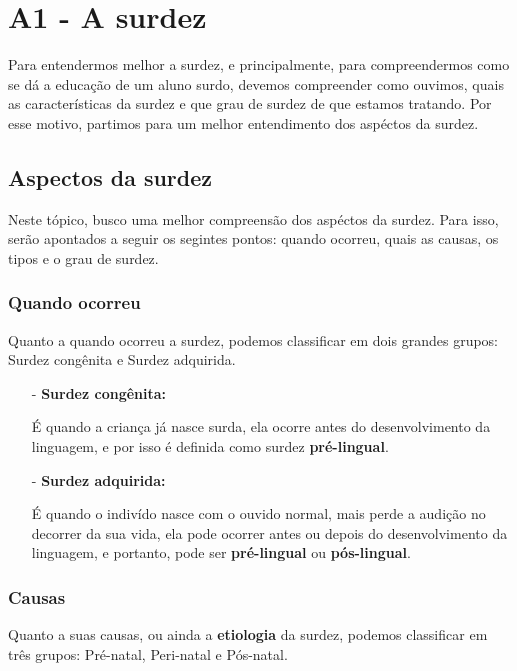 \documentclass[brasil]{abnt}
\begin{document}
\chapter*{A1 - A surdez}
	Para entendermos melhor a surdez, e principalmente, para compreendermos como se dá a educação de um aluno surdo, devemos compreender como ouvimos, quais as características da surdez e 
	que grau de surdez de que estamos tratando. Por esse motivo, partimos para um melhor entendimento dos aspéctos da surdez.	
			
		\section{Aspectos da surdez}
			Neste tópico, busco uma melhor compreensão dos aspéctos da surdez. Para isso, serão apontados a seguir os segintes pontos: quando ocorreu, 
			quais as causas, os tipos e o grau de surdez. 
			
			\subsection{Quando ocorreu}
				Quanto a quando ocorreu a surdez, podemos classificar em dois grandes grupos: Surdez congênita e Surdez adquirida. 
				
				\begin{itemize}		
					\item [-]\textbf{Surdez congênita:} 
					
						É quando a criança já nasce surda, ela ocorre antes do desenvolvimento da linguagem, e por isso é definida como 
						surdez \textbf{pré-lingual}. 
						
					\item[-]\textbf{Surdez adquirida:} 
					
						É quando o indivído nasce com o ouvido normal, mais perde a audição no decorrer da sua vida, ela pode ocorrer antes ou depois do 
						desenvolvimento da linguagem, e portanto, pode ser \textbf{pré-lingual} ou \textbf{pós-lingual}.
				\end{itemize}
				
				
			\subsection{Causas}
				Quanto a suas causas, ou ainda a \textbf{etiologia} da surdez, podemos classificar em três grupos: Pré-natal, Peri-natal e Pós-natal.
			
\end{document}
